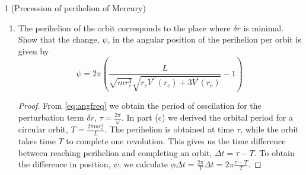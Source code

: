 \documentclass[11pt]{article}
\begin{document}
\begin{problem}{1 (Precession of perihelion of Mercury)}
\begin{enumerate}[label=(\alph*)]
\begin{proof}
			      Finally, note that since \( V^{\prime}_{\text{eff}}(r_c) = 0 \), we have that
			      \begin{equation}
				      \label{eq:17}
				      V^{\prime}(r_c) = \frac{L^2}{m r_{c}^3},
			      \end{equation}
			      and therefore, to first order,
			      \begin{equation}
				      \label{eq:26}
				      \ddot{\delta r} + \delta r \left(\frac{V^{\prime\prime}(r_c)}{m} + \frac{3}{m r_c} V^{\prime}(r_c)\right) = \ddot{\delta r} + \omega^2\delta r = 0,
			      \end{equation}
			      with
			      \begin{equation}
				      \label{eq:angfreq}
				      \omega = \sqrt{\frac{3}{m r_{c}} V^{\prime}(r_c) + \frac{1}{m} V^{\prime\prime}(r_c)}.
			      \end{equation}

		      \end{proof}
		\item The perihelion of the orbit corresponds to the place where \( \delta r \) is minimal.
		      Show that the change, \(\psi\), in the angular position of the perihelion per orbit is given by
		      \begin{equation}
			      \label{eq:6}
			      \psi = 2\pi \left( \frac{L}{\sqrt{m r_{c}^3} \sqrt{r_{c} V^{\prime\prime}(r_c) + 3 V^{'}(r_c)}} - 1 \right).
		      \end{equation}
		      \begin{proof}
			      From \cref{eq:angfreq} we obtain the period of osscilation for the perturbation term \(\delta r\), \( \tau = \frac{2\pi}{\omega} \).
			      In part (c) we derived the orbital period for a circular orbit, \( T = \frac{2\pi m r_{c}^2}{L} \).
			      The perihelion is obtained at time \(\tau\), while the orbit takes time \( T \) to complete one revolution.
			      This gives us the time difference between reaching perihelion and completing an orbit, \(\Delta t = \tau - T\).
			      To obtain the difference in position, \(\psi\), we calculate \( \dot{\phi} \Delta t = \frac{2\pi}{T} \Delta t = 2\pi \frac{\tau - T}{T} \).


\end{proof}
\end{enumerate}
\end{problem}
\end{document}
